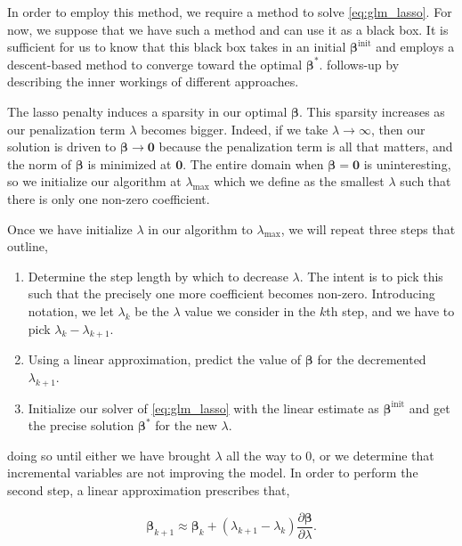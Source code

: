 \documentclass[letterpaper, 12pt]{article}
\newcommand{\bbeta}{\bm \beta}
\begin{document}
In order to employ this method, we require a method to solve
\eqref{eq:glm_lasso}. For now, we suppose that we have such a method and can use
it as a black box. It is sufficient for us to know that this black box takes in
an initial $\bbeta^\text{init}$ and employs a descent-based method to converge
toward the optimal $\bbeta^*$.  follows-up by describing
the inner workings of different approaches.

The lasso penalty induces a sparsity in our optimal $\bbeta$. This sparsity
increases as our penalization term $\lambda$ becomes bigger. Indeed, if we take
$\lambda \to \infty$, then our solution is driven to $\bbeta \to \bm{0}$ because
the penalization term is all that matters, and the norm of $\bbeta$ is minimized
at $\bm{0}$. The entire domain when $\bbeta = \bm{0}$ is uninteresting, so we
initialize our algorithm at $\lambda_\text{max}$ which we define as the smallest
$\lambda$ such that there is only one non-zero coefficient.

Once we have initialize $\lambda$ in our algorithm to $\lambda_\text{max}$, we
will repeat three steps that \cite{park2007l1} outline,

\begin{enumerate}

\item Determine the step length by which to decrease $\lambda$. The intent is to
pick this such that the precisely one more coefficient becomes non-zero.
Introducing notation, we let $\lambda_k$ be the $\lambda$ value we consider in
the $k$th step, and we have to pick $\lambda_k - \lambda_{k+1}$.

\item Using a linear approximation, predict the value of $\bbeta$ for the
decremented $\lambda_{k+1}$.

\item Initialize our solver of \eqref{eq:glm_lasso} with the linear estimate as
$\bbeta^\text{init}$ and get the precise solution $\bbeta^*$ for the new
$\lambda$.

\end{enumerate}

doing so until either we have brought $\lambda$ all the way to 0, or we
determine that incremental variables are not improving the model. In order to
perform the second step, a linear approximation prescribes that,

\[ \bbeta_{k+1} \approx \bbeta_k + (\lambda_{k+1} - \lambda_k) \frac{\partial
\bbeta}{\partial \lambda}.\]
\end{document}
